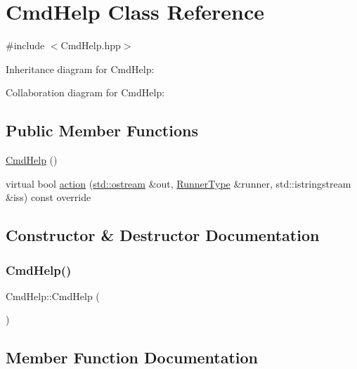 \hypertarget{classCmdHelp}{}\section{Cmd\+Help Class Reference}
\label{classCmdHelp}


{\ttfamily \#include $<$Cmd\+Help.\+hpp$>$}



Inheritance diagram for Cmd\+Help\+:


Collaboration diagram for Cmd\+Help\+:
\subsection*{Public Member Functions}
\begin{DoxyCompactItemize}
\item 
\hyperlink{classCmdHelp_a2c31488db208acdb2b30cc7bb561a69c}{Cmd\+Help} ()
\item 
virtual bool \hyperlink{classCmdHelp_adae5afd78e75a73735d0ced85b5604a5}{action} (\hyperlink{doctest_8h_a116af65cb5e924b33ad9d9ecd7a783f3}{std\+::ostream} \&out, \hyperlink{Command_8hpp_ad45c3de597c2023a8be0399d914161f4}{Runner\+Type} \&runner, std\+::istringstream \&iss) const override
\end{DoxyCompactItemize}


\subsection{Constructor \& Destructor Documentation}
\mbox{\label{classCmdHelp_a2c31488db208acdb2b30cc7bb561a69c}} 
\subsubsection{\texorpdfstring{Cmd\+Help()}{CmdHelp()}}
{\footnotesize\ttfamily Cmd\+Help\+::\+Cmd\+Help (\begin{DoxyParamCaption}{ }\end{DoxyParamCaption})}



\subsection{Member Function Documentation}
\mbox{\label{classCmdHelp_adae5afd78e75a73735d0ced85b5604a5}} 
